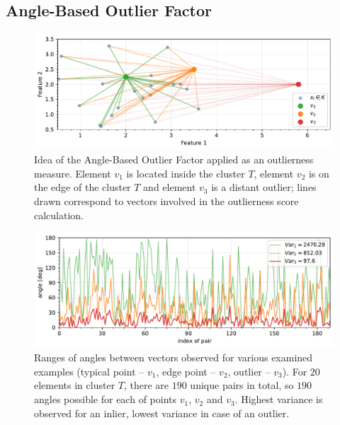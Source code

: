 \subsection{Angle-Based Outlier Factor}
\label{section:ABOF}

\begin{figure}[t]
    \centering
    \includegraphics[width=\textwidth]{images/measures/abof-distance.pdf}
    \caption{Idea of the Angle-Based Outlier Factor applied as an outlierness measure.
             Element $v_1$ is located inside the cluster $T$,
             element $v_2$ is on the edge of the cluster $T$
             and element $v_3$ is a distant outlier;
             lines drawn correspond to vectors involved in the outlierness score calculation.}
    \label{fig:abof-idea}
\end{figure}

\begin{figure}[t]
    \centering
    \includegraphics[width=\textwidth]{images/measures/abof-angles.pdf}
    \caption{Ranges of angles between vectors observed for various examined examples
             (typical point – $v_1$, edge point – $v_2$, outlier – $v_3$).
             For $20$ elements in cluster $T$, there are $190$ unique pairs in total,
             so $190$ angles possible for each of points $v_1$, $v_2$ and $v_3$.
             Highest variance is observed for an inlier, lowest variance in case of an outlier.}
    \label{fig:abof-angles}
\end{figure}

